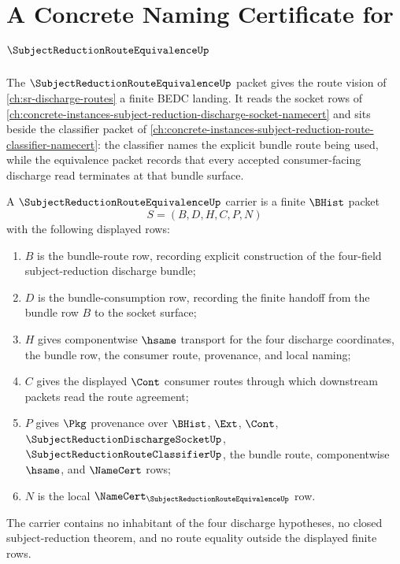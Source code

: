 \chapter{A Concrete Naming Certificate for $\SubjectReductionRouteEquivalenceUp$}
\label{ch:concrete-instances-subject-reduction-route-equivalence-namecert}

The $\SubjectReductionRouteEquivalenceUp$ packet gives the route vision of \autoref{ch:sr-discharge-routes} a finite BEDC landing. It reads the socket rows of \autoref{ch:concrete-instances-subject-reduction-discharge-socket-namecert} and sits beside the classifier packet of \autoref{ch:concrete-instances-subject-reduction-route-classifier-namecert}: the classifier names the explicit bundle route being used, while the equivalence packet records that every accepted consumer-facing discharge read terminates at that bundle surface.

\begin{definition}
\label{def:subject-reduction-route-equivalence-carrier}
A $\SubjectReductionRouteEquivalenceUp$ carrier is a finite $\BHist$ packet
$$
S=(B,D,H,C,P,N)
$$
with the following displayed rows:
\begin{enumerate}
\item $B$ is the bundle-route row, recording explicit construction of the four-field subject-reduction discharge bundle;
\item $D$ is the bundle-consumption row, recording the finite handoff from the bundle row $B$ to the socket surface;
\item $H$ gives componentwise $\hsame$ transport for the four discharge coordinates, the bundle row, the consumer route, provenance, and local naming;
\item $C$ gives the displayed $\Cont$ consumer routes through which downstream packets read the route agreement;
\item $P$ gives $\Pkg$ provenance over $\BHist$, $\Ext$, $\Cont$, $\SubjectReductionDischargeSocketUp$, $\SubjectReductionRouteClassifierUp$, the bundle route, componentwise $\hsame$, and $\NameCert$ rows;
\item $N$ is the local $\NameCert_{\SubjectReductionRouteEquivalenceUp}$ row.
\end{enumerate}
The carrier contains no inhabitant of the four discharge hypotheses, no closed subject-reduction theorem, and no route equality outside the displayed finite rows.
\end{definition}

